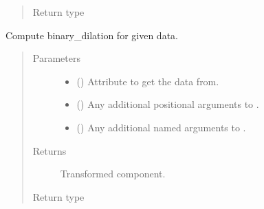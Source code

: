 \documentclass[letterpaper,10pt,english]{sphinxmanual}
\begin{document}
\begin{fulllineitems}
\begin{fulllineitems}
\begin{quote}
\begin{description}
\item[{Return type}] \leavevmode
{\hyperref[\detokenize{api/base_classes:geology.src.base_spatial.SpatialComponent}]{}}

\end{description}\end{quote}

\end{fulllineitems}


\begin{fulllineitems}
\label{\detokenize{api/states:geology.src.States.binary_dilation}}
Compute binary\_dilation for given data.
\begin{quote}\begin{description}
\item[{Parameters}] \leavevmode\begin{itemize}
\item {} 
 (\sphinxstyleliteralemphasis{\sphinxupquote{, }}) \textendash{} Attribute to get the data from.

\item {} 
 () \textendash{} Any additional positional arguments to .

\item {} 
 () \textendash{} Any additional named arguments to .

\end{itemize}

\item[{Returns}] \leavevmode
{} \textendash{} Transformed component.

\item[{Return type}] \leavevmode
{\hyperref[\detokenize{api/base_classes:geology.src.base_spatial.SpatialComponent}]{}}


\end{description}
\end{quote}
\end{fulllineitems}
\end{fulllineitems}
\end{document}
